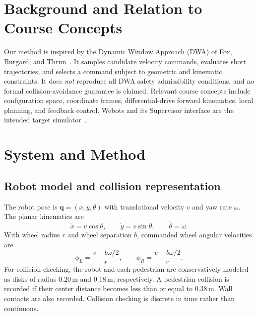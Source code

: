 \documentclass[11pt,a4paper]{article}
\begin{document}
\section{Background and Relation to Course Concepts}
Our method is inspired by the Dynamic Window Approach (DWA) of Fox, Burgard, and Thrun~\cite{fox1997dwa}. It samples candidate velocity commands, evaluates short trajectories, and selects a command subject to geometric and kinematic constraints. It does \emph{not} reproduce all DWA safety admissibility conditions, and no formal collision-avoidance guarantee is claimed. Relevant course concepts include configuration space, coordinate frames, differential-drive forward kinematics, local planning, and feedback control. Webots and its Supervisor interface are the intended target simulator~\cite{webots_supervisor,webots_turtlebot}.

\section{System and Method}
\subsection{Robot model and collision representation}
The robot pose is \(\mathbf{q}=(x,y,\theta)\) with translational velocity \(v\) and yaw rate \(\omega\). The planar kinematics are
\begin{equation}
\dot{x}=v\cos\theta,\qquad \dot{y}=v\sin\theta,\qquad \dot{\theta}=\omega.
\label{eq:kinematics}
\end{equation}
With wheel radius \(r\) and wheel separation \(b\), commanded wheel angular velocities are
\begin{equation}
\dot{\phi}_L=\frac{v-b\omega/2}{r},\qquad
\dot{\phi}_R=\frac{v+b\omega/2}{r}.
\label{eq:wheels}
\end{equation}
For collision checking, the robot and each pedestrian are conservatively modeled as disks of radius \(0.20\,\mathrm{m}\) and \(0.18\,\mathrm{m}\), respectively. A pedestrian collision is recorded if their center distance becomes less than or equal to \(0.38\,\mathrm{m}\). Wall contacts are also recorded. Collision checking is discrete in time rather than continuous.
\end{document}
